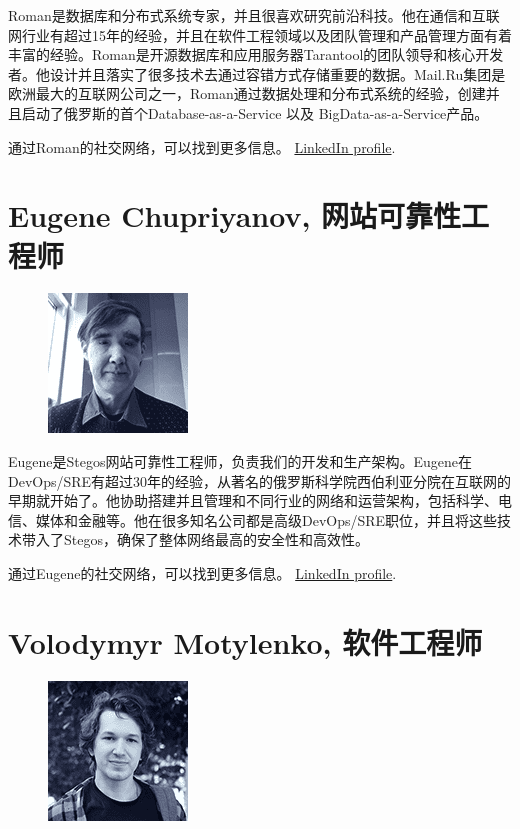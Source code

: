 \documentclass[8pt,fleqn,openany]{book}
\begin{document}
\begin{CJK*}{UTF8}{gbsn}
{{Roman是数据库和分布式系统专家，并且很喜欢研究前沿科技。他在通信和互联网行业有超过15年的经验，并且在软件工程领域以及团队管理和产品管理方面有着丰富的经验。Roman是开源数据库和应用服务器Tarantool的团队领导和核心开发者。他设计并且落实了很多技术去通过容错方式存储重要的数据。Mail.Ru集团是欧洲最大的互联网公司之一，Roman通过数据处理和分布式系统的经验，创建并且启动了俄罗斯的首个Database-as-a-Service 以及 BigData-as-a-Service产品。

通过Roman的社交网络，可以找到更多信息。 \href{https://linkedin.com/in/roman.tsisyk}{LinkedIn profile}.
}

\section{Eugene Chupriyanov, 网站可靠性工程师}

{
\setlength\intextsep{0pt}
\begin{figure}
	\includegraphics{images/team/team-5.png}
\end{figure}

Eugene是Stegos网站可靠性工程师，负责我们的开发和生产架构。Eugene在DevOps/SRE有超过30年的经验，从著名的俄罗斯科学院西伯利亚分院在互联网的早期就开始了。他协助搭建并且管理和不同行业的网络和运营架构，包括科学、电信、媒体和金融等。他在很多知名公司都是高级DevOps/SRE职位，并且将这些技术带入了Stegos，确保了整体网络最高的安全性和高效性。

通过Eugene的社交网络，可以找到更多信息。 \href{https://www.linkedin.com/in/eugenechupriyanov/}{LinkedIn profile}.
}

\section{Volodymyr Motylenko, 软件工程师}

{
\setlength\intextsep{0pt}
\begin{figure}
	\includegraphics{images/team/team-6.png}
\end{figure}

}}
\end{CJK*}
\end{document}
